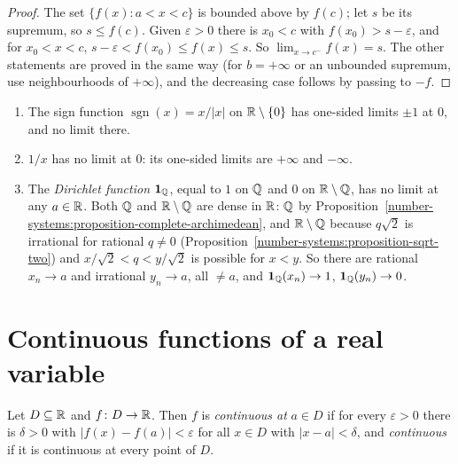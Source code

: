 \begin{proof}
The set $\{f(x) : a < x < c\}$ is bounded above by $f(c)$; let $s$ be its supremum, so $s \leq f(c)$. Given $\varepsilon > 0$ there is $x_0 < c$ with $f(x_0) > s - \varepsilon$, and for $x_0 < x < c$,
$s - \varepsilon < f(x_0) \leq f(x) \leq s$. So $\lim_{x \to c^-}f(x) = s$. The other statements are proved in the same way (for $b = +\infty$ or an unbounded supremum, use neighbourhoods of $+\infty$), and the decreasing
case follows by passing to $-f$.
\end{proof}

\begin{counterexample}\label{real-analysis:counterexample-no-limit}
\begin{enumerate}
\item The sign function $\operatorname{sgn}(x) = x/|x|$ on $\mathbb{R} \setminus \{0\}$ has one-sided limits $\pm1$ at $0$, and no limit there.
\item $1/x$ has no limit at $0$: its one-sided limits are $+\infty$ and $-\infty$.
\item The \emph{Dirichlet function} $\mathbf{1}_{\mathbb{Q}}$, equal to $1$ on $\mathbb{Q}$ and $0$ on $\mathbb{R} \setminus \mathbb{Q}$, has no limit at any $a \in \mathbb{R}$. Both $\mathbb{Q}$ and $\mathbb{R} \setminus \mathbb{Q}$ are dense in $\mathbb{R}$: $\mathbb{Q}$ by
Proposition~\ref{number-systems:proposition-complete-archimedean}, and $\mathbb{R} \setminus \mathbb{Q}$ because $q\sqrt2$ is irrational for rational $q \neq 0$ (Proposition~\ref{number-systems:proposition-sqrt-two}) and
$x/\sqrt2 < q < y/\sqrt2$ is possible for $x < y$. So there are rational $x_n \to a$ and irrational $y_n \to a$, all $\neq a$, and $\mathbf{1}_{\mathbb{Q}}(x_n) \to 1$, $\mathbf{1}_{\mathbb{Q}}(y_n) \to 0$.
\end{enumerate}
\end{counterexample}

\section{Continuous functions of a real variable}\label{real-analysis:section-continuity-real}

\begin{definition}\label{real-analysis:definition-continuity-real}
Let $D \subseteq \mathbb{R}$ and $f \colon D \to \mathbb{R}$. Then $f$ is \emph{continuous at} $a \in D$ if for every $\varepsilon > 0$ there is $\delta > 0$ with $|f(x) - f(a)| < \varepsilon$ for all $x \in D$ with
$|x - a| < \delta$, and \emph{continuous} if it is continuous at every point of $D$.
\end{definition}

